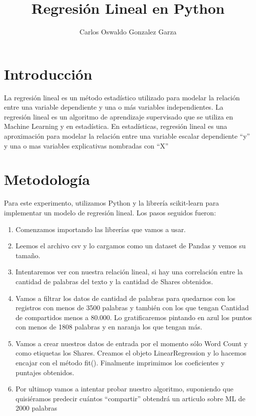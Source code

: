 \documentclass{article}
\title{Regresión Lineal en Python}
\author{Carlos Oswaldo Gonzalez Garza}
\begin{document}
\maketitle

\section{Introducción}
La regresión lineal es un método estadístico utilizado para modelar la relación entre una variable dependiente y una o más variables independientes. La regresión lineal es un algoritmo de aprendizaje supervisado que se utiliza en Machine
Learning y en estadística. En estadísticas, regresión lineal es una aproximación para modelar la relación entre una
variable escalar dependiente “y” y una o mas variables explicativas nombradas con “X”

\section{Metodología}
Para este experimento, utilizamos Python y la librería scikit-learn para implementar un modelo de regresión lineal. Los pasos seguidos fueron:

\begin{enumerate}
    \item Comenzamos importando las librerías que vamos a usar.
    \item Leemos el archivo csv y lo cargamos como un dataset de Pandas y vemos su tamaño.
    \item Intentaremos ver con nuestra relación lineal, si hay una correlación
        entre la cantidad de palabras del texto y la cantidad de Shares obtenidos.
    \item  Vamos a filtrar los datos de cantidad de palabras para quedarnos con los registros con menos de 3500 palabras y también
    con los que tengan Cantidad de compartidos menos a 80.000. Lo gratificaremos pintando en azul los
    puntos con menos de 1808 palabras y en naranja los que tengan más.
    \item Vamos a crear nuestros datos de entrada por el momento sólo Word Count y como etiquetas los 
    Shares. Creamos el objeto LinearRegression y lo hacemos encajar con el método fit().
    Finalmente imprimimos los coeficientes y puntajes obtenidos.
    \item Por ultimop vamos a intentar probar nuestro algoritmo, suponiendo que quisiéramos predecir cuántos “compartir” obtendrá un articulo sobre ML de 2000 palabras
\end{enumerate}
\end{document}
